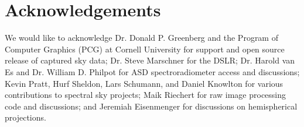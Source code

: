 \section*{Acknowledgements}

We would like to acknowledge Dr. Donald P. Greenberg and the Program of Computer Graphics (PCG) at Cornell University for support and open source release of captured sky data; Dr. Steve Marschner for the DSLR; Dr. Harold van Es and Dr. William D. Philpot for ASD spectroradiometer access and discussions; Kevin Pratt, Hurf Sheldon, Lars Schumann, and Daniel Knowlton for various contributions to spectral sky projects; Maik Riechert for raw image processing code and discussions; and Jeremiah Eisenmenger for discussions on hemispherical projections.